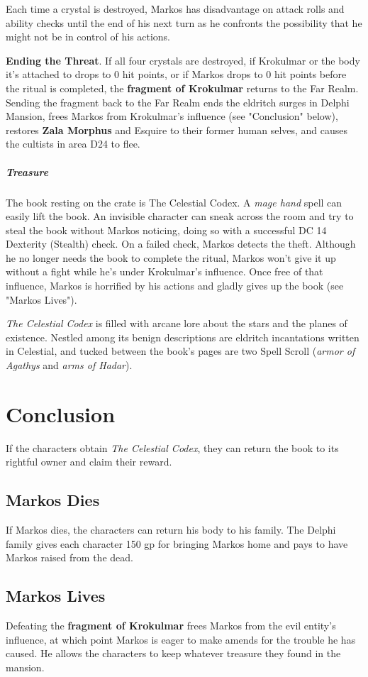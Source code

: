 \documentclass[10pt,a4paper,twoside,bg=print,twocolumn,openany,nodeprecatedcode]{dndbook}
\begin{document}
Each time a crystal is destroyed, Markos has disadvantage on attack rolls and ability checks until the end of his next turn as he confronts the possibility that he might not be in control of his actions.

\textbf{Ending the Threat}. If all four crystals are destroyed, if Krokulmar or the body it's attached to drops to 0 hit points, or if Markos drops to 0 hit points before the ritual is completed, the \textbf{fragment of Krokulmar} returns to the Far Realm. Sending the fragment back to the Far Realm ends the eldritch surges in Delphi Mansion, frees Markos from Krokulmar's influence (see "Conclusion" below), restores \textbf{Zala Morphus} and Esquire to their former human selves, and causes the cultists in area D24 to flee.

\subparagraph{Treasure}
The book resting on the crate is The Celestial Codex. A \textit{mage hand} spell can easily lift the book. An invisible character can sneak across the room and try to steal the book without Markos noticing, doing so with a successful DC 14 Dexterity (Stealth) check. On a failed check, Markos detects the theft. Although he no longer needs the book to complete the ritual, Markos won't give it up without a fight while he's under Krokulmar's influence. Once free of that influence, Markos is horrified by his actions and gladly gives up the book (see "Markos Lives").

\textit{The Celestial Codex} is filled with arcane lore about the stars and the planes of existence. Nestled among its benign descriptions are eldritch incantations written in Celestial, and tucked between the book's pages are two Spell Scroll (\textit{armor of Agathys} and \textit{arms of Hadar}).

\section{Conclusion}
If the characters obtain \textit{The Celestial Codex}, they can return the book to its rightful owner and claim their reward.

\subsection{Markos Dies}
If Markos dies, the characters can return his body to his family. The Delphi family gives each character 150 gp for bringing Markos home and pays to have Markos raised from the dead.

\subsection{Markos Lives}
Defeating the \textbf{fragment of Krokulmar} frees Markos from the evil entity's influence, at which point Markos is eager to make amends for the trouble he has caused. He allows the characters to keep whatever treasure they found in the mansion.
\end{document}
